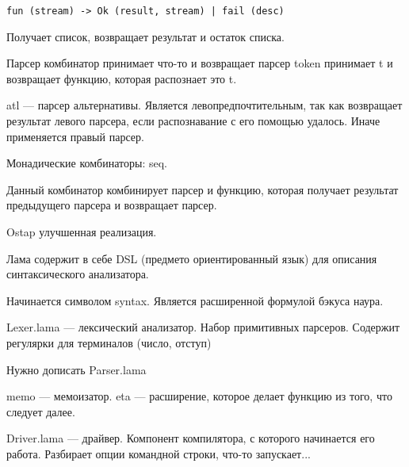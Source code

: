\begin{verbatim}
fun (stream) -> Ok (result, stream) | fail (desc)
\end{verbatim}

Получает список, возвращает результат и остаток списка.

Парсер комбинатор принимает что-то и возвращает парсер
token принимает t и возвращает функцию, которая распознает это t.

atl --- парсер альтернативы. Является левопредпочтительным, так как возвращает
результат левого парсера, если распознавание с его помощью удалось. Иначе
применяется правый парсер.

Монадические комбинаторы: seq.

Данный комбинатор комбинирует парсер и функцию, которая получает результат
предыдущего парсера и возвращает парсер.

Ostap улучшенная реализация.

Лама содержит в себе DSL (предмето ориентированный язык) для описания
синтаксического анализатора.

Начинается символом syntax. Является расширенной формулой бэкуса наура.

Lexer.lama --- лексический анализатор. Набор примитивных парсеров. Содержит
регулярки для терминалов (число, отступ)

Нужно дописать Parser.lama

memo --- мемоизатор. eta --- расширение, которое делает функцию из того, что
следует далее.

Driver.lama --- драйвер. Компонент компилятора, с которого начинается его
работа. Разбирает опции командной строки, что-то запускает...





